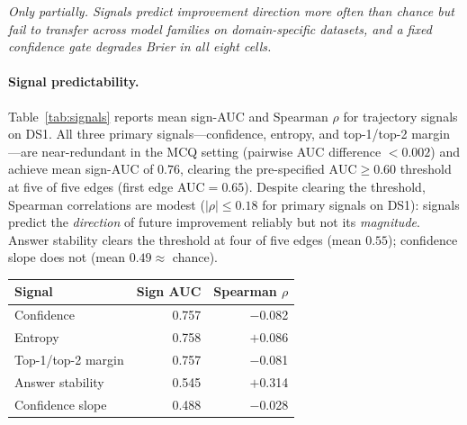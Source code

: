 \documentclass[a4paper,fleqn]{cas-sc}
\theoremstyle{plain}
\theoremstyle{definition}
\theoremstyle{remark}
\begin{document}
\textit{Only partially. Signals predict improvement direction more often than
chance but fail to transfer across model families on domain-specific datasets,
and a fixed confidence gate degrades Brier in all eight cells.}

\paragraph{Signal predictability.}
Table~\ref{tab:signals} reports mean sign-AUC and Spearman $\rho$ for
trajectory signals on DS1.
All three primary signals---confidence, entropy, and top-1/top-2 margin---are
near-redundant in the MCQ setting (pairwise AUC difference ${<}0.002$) and
achieve mean sign-AUC of $0.76$, clearing the pre-specified
$\mathrm{AUC}\geq0.60$ threshold at five of five edges (first edge AUC$=0.65$).
Despite clearing the threshold, Spearman correlations are modest
($|\rho|{\leq}0.18$ for primary signals on DS1): signals predict the
\emph{direction} of future improvement reliably but not its \emph{magnitude}.
Answer stability clears the threshold at four of five edges (mean $0.55$);
confidence slope does not (mean $0.49\approx$ chance).

\begin{center}
\begin{tabular}{@{}lrr@{}}
\toprule
Signal & Sign AUC & Spearman $\rho$ \\
\midrule
Confidence         & 0.757 & $-$0.082 \\
Entropy            & 0.758 & $+$0.086 \\
Top-1/top-2 margin & 0.757 & $-$0.081 \\
Answer stability   & 0.545 & $+$0.314 \\
Confidence slope   & 0.488 & $-$0.028 \\
\bottomrule
\end{tabular}
\end{center}
\begingroup
{}
\label{tab:signals}
\endgroup
\vspace{\baselineskip}
\end{document}
